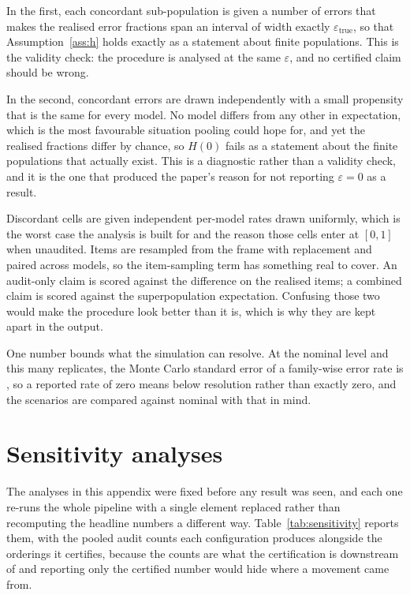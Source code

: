 In the first, each concordant sub-population is given a number of errors that makes the
realised error fractions span an interval of width exactly $\varepsilon_{\mathrm{true}}$, so
that Assumption~\ref{ass:h} holds exactly as a statement about finite populations. This is the
validity check: the procedure is analysed at the same $\varepsilon$, and no certified claim
should be wrong.

In the second, concordant errors are drawn independently with a small propensity that is the
same for every model. No model differs from any other in expectation, which is the most
favourable situation pooling could hope for, and yet the realised fractions differ by chance,
so $H(0)$ fails as a statement about the finite populations that actually exist. This is a
diagnostic rather than a validity check, and it is the one that produced the paper's reason
for not reporting $\varepsilon = 0$ as a result.

Discordant cells are given independent per-model rates drawn uniformly, which is the worst
case the analysis is built for and the reason those cells enter at $[0,1]$ when unaudited.
Items are resampled from the frame with replacement and paired across models, so the
item-sampling term has something real to cover. An audit-only claim is scored against the
difference on the realised items; a combined claim is scored against the superpopulation
expectation. Confusing those two would make the procedure look better than it is, which is why
they are kept apart in the output.

One number bounds what the simulation can resolve. At the nominal level and this many
replicates, the Monte Carlo standard error of a family-wise error rate is \SimMcSeAudit{}, so
a reported rate of zero means below resolution rather than exactly zero, and the scenarios are
compared against nominal with that in mind.

\section{Sensitivity analyses}
\label{app:sensitivity}

The analyses in this appendix were fixed before any result was seen, and each one re-runs the
whole pipeline with a single element replaced rather than recomputing the headline numbers a
different way. Table~\ref{tab:sensitivity} reports them, with the pooled audit counts each
configuration produces alongside the orderings it certifies, because the counts are what the
certification is downstream of and reporting only the certified number would hide where a
movement came from.

